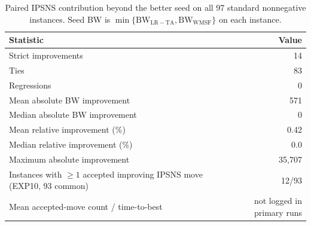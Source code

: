 \begin{table}[t]
\centering
\footnotesize
\caption{Paired IPSNS contribution beyond the better seed on all 97 standard nonnegative instances. Seed BW is \(\min\{\mathrm{BW}_{\mathrm{LR-TA}},\mathrm{BW}_{\mathrm{WMSF}}\}\) on each instance.}
\label{tab:ipsns-vs-seed}
\begin{tabular}{@{}lr@{}}
\toprule
Statistic & Value \\
\midrule
Strict improvements & 14 \\
Ties & 83 \\
Regressions & 0 \\
Mean absolute BW improvement & 571 \\
Median absolute BW improvement & 0 \\
Mean relative improvement (\%) & 0.42 \\
Median relative improvement (\%) & 0.0 \\
Maximum absolute improvement & 35,707 \\
Instances with \(\ge 1\) accepted improving IPSNS move (EXP10, 93 common) & 12/93 \\
Mean accepted-move count / time-to-best & not logged in primary runs \\
\bottomrule
\end{tabular}
\end{table}
